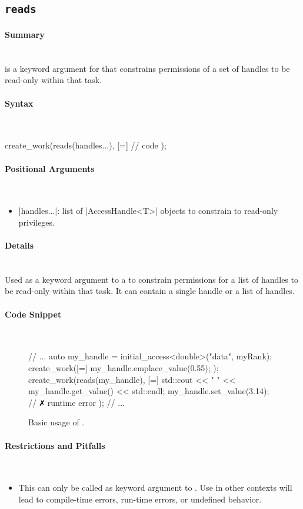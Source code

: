 \subsection{\texttt{reads}}
\label{ssec:api_fe_reads}

\paragraph{Summary} \mbox{}\\
 is a \gls{keyword argument} for  that
constrains permissions of a set of \glspl{handle} to be read-only within that \gls{task}.

\paragraph{Syntax} \mbox{}\\
\begin{CppCode}
create_work(reads(handles...), [=]{
  // code 
});
\end{CppCode}

\paragraph{Positional Arguments} \mbox{}\\
\begin{itemize}
  \item |handles...|: list of |AccessHandle<T>| objects to
  constrain to read-only privileges.
\end{itemize}


\paragraph{Details} \mbox{}\\
Used as a \gls{keyword argument} to a  to constrain
permissions for a list of \glspl{handle} to be read-only within that \gls{task}.
It can contain a single \gls{handle} or a list of \glspl{handle}.  

\paragraph{Code Snippet} \mbox{}\\
\begin{figure}[!h]
\begin{CppCodeNumb}
// ...
auto my_handle = initial_access<double>("data", myRank);
create_work([=]{
  my_handle.emplace_value(0.55);
});
create_work(reads(my_handle), [=]{
  std::cout << " " << my_handle.get_value() << std::endl;
  my_handle.set_value(3.14); // $\no$ runtime error
});
// ... 
\end{CppCodeNumb}
\label{fig:fe_api_reads}
\caption{Basic usage of \protect{}.}
\end{figure}


\paragraph{Restrictions and Pitfalls}\mbox{}\\
\begin{itemize}
  \item This can only be called as \gls{keyword argument} to .  Use in
  other contexts will lead to compile-time errors, run-time errors, or
  undefined behavior.
\end{itemize}
